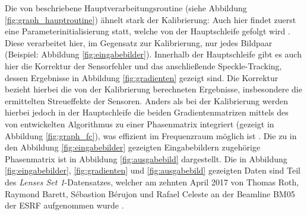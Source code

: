 Die von \citeauthor{Ber15} beschriebene Hauptverarbeitungsroutine (siehe Abbildung \ref{fig:graph_hauptroutine}) ähnelt stark der Kalibrierung: Auch hier findet zuerst eine Parameterinitialisierung statt, welche von der Hauptschleife gefolgt wird . Diese verarbeitet hier, im Gegensatz zur Kalibrierung, nur jedes Bildpaar (Beispiel: Abbildung \ref{fig:eingabebilder}). Innerhalb der Hauptschleife gibt es auch hier die Korrektur der Sensorfehler und das anschließende Speckle-Tracking, dessen Ergebnisse in Abbildung \ref{fig:gradienten} gezeigt sind. Die Korrektur bezieht hierbei die von der Kalibrierung berechneten Ergebnisse, insbesondere die ermittelten Streueffekte der Sensoren. Anders als bei der Kalibrierung werden hierbei jedoch in der Hauptschleife die beiden Gradientenmatrizen mittels des von \citeauthor{FC88} entwickelten Algorithmus zu einer Phasenmatrix integriert (gezeigt in Abbildung \ref{fig:graph_fc}), was effizient im Frequenzraum möglich ist \cite{FC88}. Die zu in den Abbildung \ref{fig:eingabebilder} gezeigten Eingabebildern zugehörige Phasenmatrix ist in Abbildung \ref{fig:ausgabebild} dargestellt. Die in Abbildung \ref{fig:eingabebilder}, \ref{fig:gradienten} und \ref{fig:ausgabebild} gezeigten Daten sind Teil des \textit{Lenses Set 1}-Datensatzes, welcher am zehnten April 2017 von Thomas Roth, Raymond Barett, Sébastion Bérujon und Rafael Celeste an der Beamline BM05 der \gls{ESRF} aufgenommen wurde \cite{RBB+17}. 

